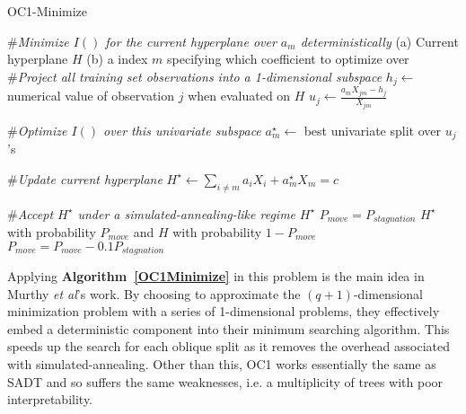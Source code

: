 \begin{algorithm}
\caption{OC1-Minimize}
\begin{algorithmic}
\STATE \#\emph{Minimize $I()$ for the current hyperplane over $a_m$ deterministically}
\medskip
\REQUIRE (a) Current hyperplane $H$ (b) a index $m$ specifying which coefficient to optimize over\\

\medskip
\STATE \#\emph{Project all training set observations into a 1-dimensional subspace}
	\STATE $h_j\leftarrow$ numerical value of observation $j$ when evaluated on $H$
	\STATE $u_j\leftarrow\frac{a_m X_{jm}-h_j}{X_{jm}}$
\ENDFOR

\medskip
\STATE \#\emph{Optimize $I()$ over this univariate subspace}
\STATE $a_m^\star\leftarrow$ best univariate split over $u_j$'s

\medskip
\STATE \#\emph{Update current hyperplane}
\STATE $H^\star\leftarrow\sum_{i\neq m} a_iX_i + a_m^\star X_m=c$

\medskip
\STATE \#\emph{Accept $H^\star$ under a simulated-annealing-like regime}
	\RETURN $H^\star$
	\STATE $P_{move}=P_{stagnation}$
	\RETURN $H^\star$ with probability $P_{move}$ and $H$ with probability $1-P_{move}$
	\STATE $P_{move}=P_{move}-0.1P_{stagnation}$
\ENDIF
\end{algorithmic}
\label{OC1Minimize}
\end{algorithm}

Applying \textbf{Algorithm~\ref{OC1Minimize}} in this problem is the main idea in Murthy \emph{et al}'s work. By choosing to approximate the $(q+1)$-dimensional minimization problem with a series of 1-dimensional problems, they effectively embed a deterministic component into their minimum searching algorithm. This speeds up the search for each oblique split as it removes the overhead associated with simulated-annealing. Other than this, OC1 works essentially the same as SADT and so suffers the same weaknesses, i.e. a multiplicity of trees with poor interpretability. 

